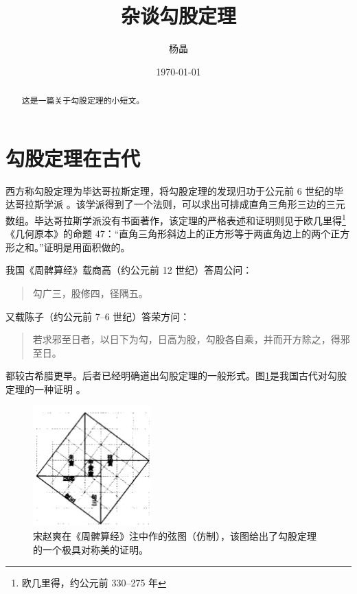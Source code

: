 \documentclass[UTF8]{ctexart}
\title{\heiti 杂谈勾股定理}
\author{\kaishu 杨晶}
\date{\today}
\newenvironment{myquote}
  {\begin{quote}\kaishu\zihao{-5}}
  {\end{quote}}
\begin{document}
\maketitle
\begin{abstract}
这是一篇关于勾股定理的小短文。
\end{abstract}
\tableofcontents
\section{勾股定理在古代}\label{sec:1st}
西方称勾股定理为毕达哥拉斯定理，将勾股定理的发现归功于公元前 6 世纪的毕达哥拉斯学派 \cite{Kline}。该学派得到了一个法则，可以求出可排成直角三角形三边的三元数组。毕达哥拉斯学派没有书面著作，该定理的严格表述和证明则见于欧几里得\footnote{欧几里得，约公元前 330--275 年}《几何原本》的命题 47：“直角三角形斜边上的正方形等于两直角边上的两个正方形之和。”证明是用面积做的。
  
我国《周髀算经》载商高（约公元前 12 世纪）答周公问：
\begin{myquote}
 勾广三，股修四，径隅五。
\end{myquote}
又载陈子（约公元前 7--6 世纪）答荣方问：
\begin{myquote}
 若求邪至日者，以日下为勾，日高为股，勾股各自乘，并而开方除之，得邪至日。
\end{myquote}
都较古希腊更早。后者已经明确道出勾股定理的一般形式。图\ref{fig:xiantu}是我国古代对勾股定理的一种证明 \cite{quanjing}。
\begin{figure}[ht]
\centering
\includegraphics[scale=0.6]{Screenshot 2021-07-12 155214.png}
\caption{宋赵爽在《周髀算经》注中作的弦图（仿制），该图给出了勾股定理的一个极具对称美的证明。}
\label{fig:xiantu}
\end{figure}
\end{document}
